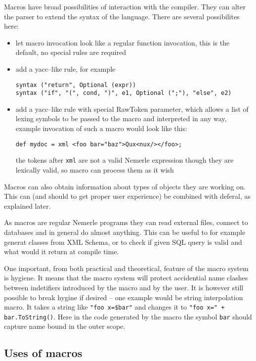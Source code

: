 \documentclass{article}
\begin{document}
Macros have broad possibilities of interaction with the compiler.
They can alter the parser to extend the syntax of the language.
There are several possibilites here:
\begin{itemize}
\item let macro invocation look like a regular function invocation,
      this is the default, no special rules are required
\item add a yacc--like rule, for example
\begin{verbatim}
syntax ("return", Optional (expr))
syntax ("if", "(", cond, ")", e1, Optional (";"), "else", e2)
\end{verbatim}
\item add a yacc--like rule with special RawToken parameter,
      which allows a list of lexing symbols to be passed
      to the macro and interpreted in any way, example invocation
      of such a macro would look like this:
\begin{verbatim}
def mydoc = xml <foo bar="baz">Qux<nux/></foo>;
\end{verbatim}
   the tokens after \texttt{xml} are not a valid Nemerle expression
   though they are lexically valid, so macro can process them as it wish
\end{itemize}

Macros can also obtain information about types of objects they are
working on. This can (and should to get proper user experience) be 
combined with deferal, as explained later.

As macros are regular Nemerle programs they can read external
files, connect to databases  and in general do almost anything.
This can be useful to for example generat classes from XML Schema,
or to check if given SQL query is valid and what would it return
at compile time.

One important, from both practical and theoretical, feature of the macro 
system is hygiene. It means that the macro system will protect accidential
name clashes between indetifiers introduced by the macro and by the user.
It is however still possible to break hygine if desired -- one example
would be string interpolation macro. It takes a string like 
\texttt{"foo x=\$bar"} and changes it to \texttt{"foo x=" + bar.ToString()}.
Here in the code generated by the macro the symbol \texttt{bar} should
capture name bound in the outer scope.

\subsection{Uses of macros}
\end{document}
